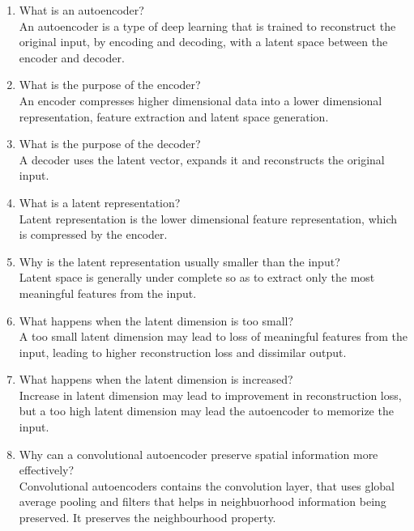 \documentclass[10pt]{article}
\begin{document}
\begin{enumerate}
\item What is an autoencoder?\\
\text An autoencoder is a type of deep learning that is trained to reconstruct the original input, by encoding and decoding, with a latent space between the encoder and decoder.

\item What is the purpose of the encoder?\\
\text An encoder compresses higher dimensional data into a lower dimensional representation, feature extraction and latent space generation.

\item What is the purpose of the decoder?\\
\text A decoder uses the latent vector, expands it and reconstructs the original input.

\item What is a latent representation?\\
\text Latent representation is the lower dimensional feature representation, which is compressed by the encoder.

\item Why is the latent representation usually smaller than the input?\\
\text Latent space is generally under complete so as to extract only the most meaningful features from the input.

\item What happens when the latent dimension is too small?\\
\text A too small latent dimension may lead to loss of meaningful features from the input, leading to higher reconstruction loss and dissimilar output.

\item What happens when the latent dimension is increased?\\
\text Increase in latent dimension may lead to improvement in reconstruction loss, but a too high latent dimension may lead the autoencoder to memorize the input.

\item Why can a convolutional autoencoder preserve spatial information more effectively?\\
\text Convolutional autoencoders contains the convolution layer, that uses global average pooling and filters that helps in neighbuorhood information being preserved. It preserves the neighbourhood property.


\end{enumerate}
\end{document}
